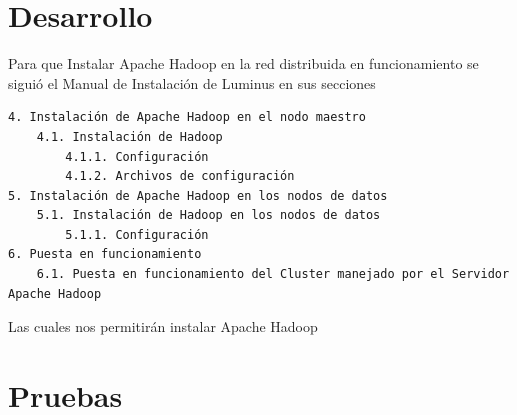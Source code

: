 \section{Desarrollo}
Para que Instalar Apache Hadoop en la red distribuida en funcionamiento se siguió el Manual de Instalación de Luminus 
en sus secciones 
\begin{verbatim}
4. Instalación de Apache Hadoop en el nodo maestro
	4.1. Instalación de Hadoop 
		4.1.1. Configuración
		4.1.2. Archivos de configuración
5. Instalación de Apache Hadoop en los nodos de datos
	5.1. Instalación de Hadoop en los nodos de datos 
		5.1.1. Configuración 
6. Puesta en funcionamiento
	6.1. Puesta en funcionamiento del Cluster manejado por el Servidor Apache Hadoop
\end{verbatim}
Las cuales nos permitirán instalar Apache Hadoop
\section{Pruebas}
